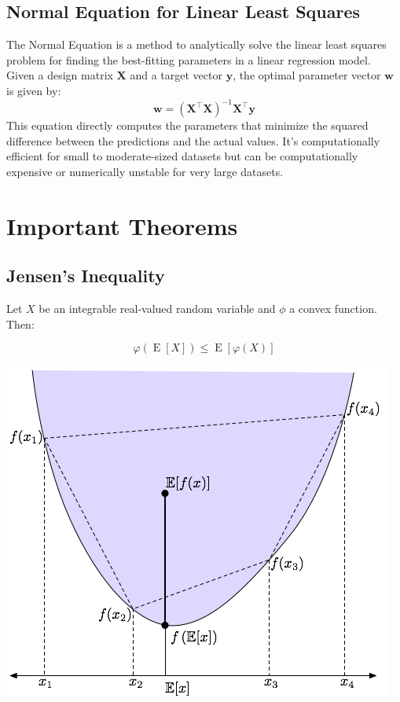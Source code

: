 \documentclass[8pt, a4paper, landscape, includeheadfoot]{extarticle}
\begin{document}
\begin{multicols*}{4}
	\subsection{Normal Equation for Linear Least Squares}
	The Normal Equation is a method to analytically solve the linear least squares problem for finding the best-fitting parameters in a linear regression model. Given a design matrix \(\mathbf{X}\) and a target vector \(\mathbf{y}\), the optimal parameter vector \(\mathbf{w}\) is given by:
	\[
		\mathbf{w} = \left(\mathbf{X}^\top \mathbf{X}\right)^{-1} \mathbf{X}^\top \mathbf{y}
	\]
	This equation directly computes the parameters that minimize the squared difference between the predictions and the actual values. It's computationally efficient for small to moderate-sized datasets but can be computationally expensive or numerically unstable for very large datasets.

	\section{Important Theorems}

	\subsection{Jensen's Inequality}

	Let $X$ be an integrable real-valued random variable and $\phi$ a convex function. Then:

	$$\varphi\left(\operatorname{E}[X]\right) \leq \operatorname{E} \left[ \varphi(X) \right]$$
	\begin{center}
		\includegraphics[width=0.8\linewidth]{0_images/jensen.png}
	\end{center}


\end{multicols*}
\end{document}
